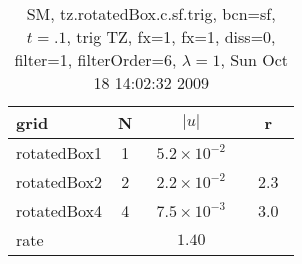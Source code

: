 \begin{table}[hbt]\tableFont %
\begin{center}
\begin{tabular}{|l|c|c|c|} \hline 
grid  & N &  $\vert u \vert$   & r \\ \hline 
         rotatedBox1 &     1 & ~$5.2\times10^{ -2}$~ &            \\ \hline
         rotatedBox2 &     2 & ~$2.2\times10^{ -2}$~ & ~$  2.3$~  \\ \hline
         rotatedBox4 &     4 & ~$7.5\times10^{ -3}$~ & ~$  3.0$~  \\ \hline
    rate             &       &       $1.40$         &        \\ \hline
\end{tabular}
\caption{SM, tz.rotatedBox.c.sf.trig, bcn=sf, $t=.1$, trig TZ, fx=1, fx=1, diss=0, filter=1, filterOrder=6, $\lambda=1$,  Sun Oct 18 14:02:32 2009}\label{table:tz.rotatedBox.c.sf.trig}
\end{center}
\end{table}
